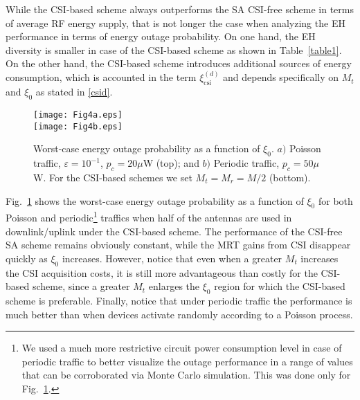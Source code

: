 \documentclass[10pt,journal,a4paper]{IEEEtran}
\begin{document}
	While  the CSI-based scheme always outperforms the SA CSI-free scheme in terms of average RF energy  supply, that is not longer the case when analyzing the EH performance in terms of energy outage probability. On one hand, the EH diversity is smaller in case of the CSI-based scheme as shown in Table~\ref{table1}. On the other hand, the CSI-based scheme introduces additional sources of energy consumption, which is accounted in the term $\xi_\mathrm{csi}^{(d)}$ and depends specifically on $M_t$ and $\xi_0$ as stated in \eqref{csid}. 
%
	\begin{figure}[t!]
	\texttt{[image: Fig4a.eps]}\vspace{3mm}\\
	\texttt{[image: Fig4b.eps]}
	\caption{Worst-case energy outage probability as a function of $\xi_0$. $a)$ Poisson traffic, $\varepsilon=10^{-1}$, $p_c=20\mu$W (top); and $b)$ Periodic traffic, $p_c=50\mu$W. For the CSI-based schemes we set $M_t=M_r=M/2$ (bottom).}		
	\label{Fig4}
\end{figure}
	
	Fig.~\ref{Fig4} shows the worst-case energy outage probability as a function of $\xi_0$ for both Poisson and periodic\footnote{We used a much more restrictive circuit power consumption level in case of periodic traffic to better visualize the outage performance in a range of values that can be corroborated via Monte Carlo simulation. This was done only for Fig.~\ref{Fig4}.} traffics when half of the antennas are used in downlink/uplink under the CSI-based scheme. The performance of the CSI-free SA scheme remains obviously constant, while  the MRT gains from CSI disappear quickly as $\xi_0$ increases. However, notice that even when a greater $M_t$ increases the CSI acquisition costs, it is still more advantageous than costly for the CSI-based scheme, since a greater $M_t$ enlarges the $\xi_0$ region for which the CSI-based scheme is preferable. Finally, notice that under periodic traffic the performance is much better than when devices activate randomly according to a Poisson process.
\end{document}
